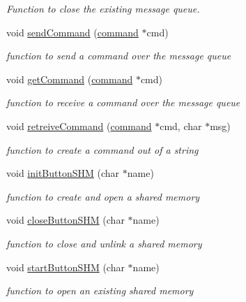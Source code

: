 \begin{DoxyCompactItemize}
\begin{DoxyCompactList}\small\item\em Function to close the existing message queue. \end{DoxyCompactList}\item 
void \hyperlink{group__common_ga1653c969d3ac19ddeb05fdf8d7df90d4}{send\-Command} (\hyperlink{structcommand}{command} $\ast$cmd)
\begin{DoxyCompactList}\small\item\em function to send a command over the message queue \end{DoxyCompactList}\item 
void \hyperlink{group__common_gae7b8b16d315569f975f0ee85d4341d21}{get\-Command} (\hyperlink{structcommand}{command} $\ast$cmd)
\begin{DoxyCompactList}\small\item\em function to receive a command over the message queue \end{DoxyCompactList}\item 
void \hyperlink{group__common_ga592805897a9614b316d77587465d7ec3}{retreive\-Command} (\hyperlink{structcommand}{command} $\ast$cmd, char $\ast$msg)
\begin{DoxyCompactList}\small\item\em function to create a command out of a string \end{DoxyCompactList}\item 
void \hyperlink{group__common_ga8f88b2b1883d6146fbd5daa273f14794}{init\-Button\-S\-H\-M} (char $\ast$name)
\begin{DoxyCompactList}\small\item\em function to create and open a shared memory \end{DoxyCompactList}\item 
void \hyperlink{group__common_ga06537012ed628ca860f4412382d24674}{close\-Button\-S\-H\-M} (char $\ast$name)
\begin{DoxyCompactList}\small\item\em function to close and unlink a shared memory \end{DoxyCompactList}\item 
void \hyperlink{group__common_gaa077f3417f78edd62689d435b9b753d3}{start\-Button\-S\-H\-M} (char $\ast$name)
\begin{DoxyCompactList}\small\item\em function to open an existing shared memory \end{DoxyCompactList}\item 

\end{DoxyCompactItemize}
